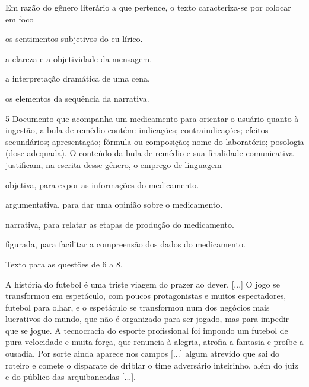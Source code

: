 Em razão do gênero literário a que pertence, o texto caracteriza-se por
colocar em foco

\begin{escolha}
\item os sentimentos subjetivos do eu lírico.

\item a clareza e a objetividade da mensagem.

\item a interpretação dramática de uma cena.

\item os elementos da sequência da narrativa.
\end{escolha}

\num{5} Documento que acompanha um medicamento para orientar o
usuário quanto à ingestão, a bula de remédio contém: indicações;
contraindicações; efeitos secundários; apresentação; fórmula ou composição;
nome do laboratório; posologia (dose adequada). O conteúdo 
da bula de remédio e sua finalidade comunicativa justificam,
na escrita desse gênero, o emprego de linguagem

\begin{escolha}
\item objetiva, para expor as informações do medicamento.

\item argumentativa, para dar uma opinião sobre o medicamento.

\item narrativa, para relatar as etapas de produção do medicamento.

\item figurada, para facilitar a compreensão dos dados do medicamento.
\end{escolha}


Texto para as questões de 6 a 8.

\begin{myquote}
A história do futebol é uma triste viagem do prazer ao dever. {[}...{]}
O jogo se transformou em espetáculo, com poucos protagonistas e muitos
espectadores, futebol para olhar, e o espetáculo se transformou num dos
negócios mais lucrativos do mundo, que não é organizado para ser jogado,
mas para impedir que se jogue. A tecnocracia do esporte profissional foi
impondo um futebol de pura velocidade e muita força, que renuncia à
alegria, atrofia a fantasia e proíbe a ousadia. Por sorte ainda aparece
nos campos {[}...{]} algum atrevido que sai do roteiro e comete o
disparate de driblar o time adversário inteirinho, além do juiz e do
público das arquibancadas {[}...{]}.

\end{myquote}

